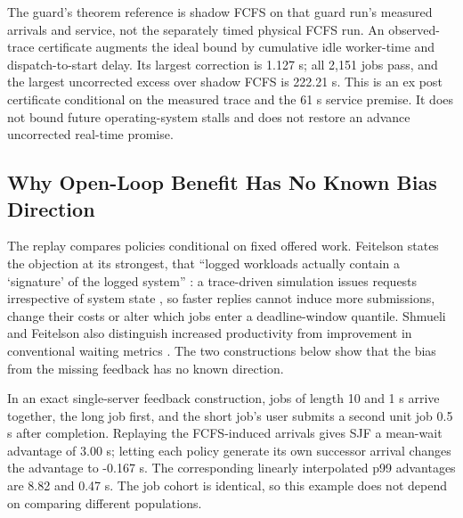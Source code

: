 \documentclass[mathematics,supfile,submit,moreauthors]{Definitions/mdpi}
\newcommand{\devnum}[1]{#1}
\begin{document}
The guard's theorem reference is shadow FCFS on that guard run's measured arrivals
and service, not the separately timed physical FCFS run. An observed-trace
certificate augments the ideal bound by cumulative idle worker-time and
dispatch-to-start delay. Its largest correction is \devnum{1.127} s;
all \devnum{2{,}151} jobs pass, and the largest uncorrected excess over shadow FCFS
is \devnum{222.21} s. This is an ex post certificate conditional on the measured
trace and the \devnum{61} s service premise. It does not bound future operating-system
stalls and does not restore an advance uncorrected real-time promise.

\subsection{Why Open-Loop Benefit Has No Known Bias Direction}

The replay compares policies conditional on fixed offered work. Feitelson states the
objection at its strongest, that ``logged workloads actually contain a `signature' of the
logged system'' \cite{feitelson2021resampling}: a trace-driven simulation issues requests
irrespective of system state \cite{shmueli2009simulation}, so faster replies cannot
induce more submissions, change their costs or alter which jobs enter a deadline-window
quantile. Shmueli and Feitelson also distinguish increased productivity from improvement
in conventional waiting metrics \cite{shmueli2009simulation}. The two constructions below
show that the bias from the missing feedback has no known direction.

In an exact
single-server feedback construction, jobs of length \devnum{10} and \devnum{1} s
arrive together, the long job first, and the short job's user submits a second
unit job \devnum{0.5} s after completion. Replaying the FCFS-induced arrivals
gives SJF a mean-wait advantage of \devnum{3.00} s; letting each policy generate
its own successor arrival changes the advantage to \devnum{-0.167} s.
The corresponding linearly interpolated p99 advantages are \devnum{8.82} and
\devnum{0.47} s. The job cohort is identical, so this example does not depend on
comparing different populations.
\end{document}
